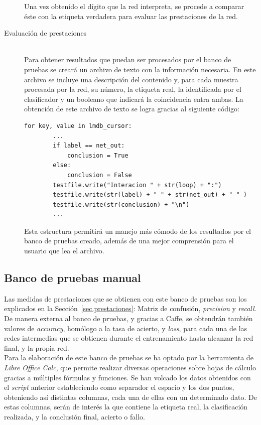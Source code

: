 \begin{description}
	Una vez obtenido el dígito que la red interpreta, se procede a comparar éste con la etiqueta verdadera para evaluar las prestaciones de la red.
	\vspace{5pt}
	\item[Evaluación de prestaciones] \hfill 
	\vspace{5pt}
	\\
	Para obtener resultados que puedan ser procesados por el banco de pruebas se creará un archivo de texto con la información necesaria. En este archivo se incluye una descripción del contenido y, para cada muestra procesada por la red, su número, la etiqueta real, la identificada por el clasificador y un booleano que indicará la coincidencia entra ambas. La obtención de este archivo de texto se logra gracias al siguiente código:
	\vspace{10pt}
	\begin{lstlisting}[frame=single]
	for key, value in lmdb_cursor:
		...
		if label == net_out:
			conclusion = True
		else:
			conclusion = False
		testfile.write("Interacion " + str(loop) + ":")
		testfile.write(str(label) + " " + str(net_out) + " " )
		testfile.write(str(conclusion) + "\n")
		...
	\end{lstlisting}
	
	Esta estructura permitirá un manejo más cómodo de los resultados por el banco de pruebas creado, además de una mejor comprensión para el usuario que lea el archivo.
\end{description}

\subsection{Banco de pruebas manual}
Las medidas de prestaciones que se obtienen con este banco de pruebas son los explicados en la Sección~\ref{sec.prestaciones}: Matriz de confusión, \textit{precision} y \textit{recall}. De manera externa al banco de pruebas, y gracias a Caffe, se obtendrán también valores de \textit{accuracy}, homólogo a la tasa de acierto, y \textit{loss}, para cada una de las redes intermedias que se obtienen durante el entrenamiento hasta alcanzar la red final, y la propia red.\\

Para la elaboración de este banco de pruebas se ha optado por la herramienta de \textit{Libre Office Calc}, que permite realizar diversas operaciones sobre hojas de cálculo gracias a múltiples fórmulas y funciones. Se han volcado los datos obtenidos con el \textit{script} anterior estableciendo como separador el espacio y los dos puntos, obteniendo así distintas columnas, cada una de ellas con un determinado dato. De estas columnas, serán de interés la que contiene la etiqueta real, la clasificación realizada, y la conclusión final, acierto o fallo.\\

